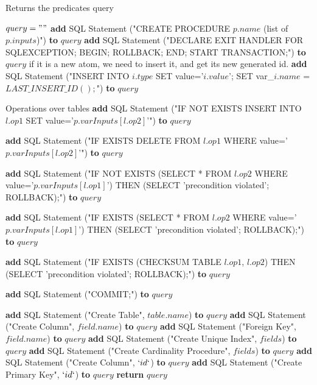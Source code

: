 \documentclass[oneside]{book}
\begin{document}
\begin{algorithm}
\caption{Returns the predicates query}
\label{array-sum2}
\begin{algorithmic}[2]
	\State $query = ""$
	\State \textbf{add} SQL Statement ("CREATE PROCEDURE $p.name$ (list of $p.inputs$)") \textbf{to} $query$
	\State \textbf{add} SQL Statement ("DECLARE EXIT HANDLER FOR SQLEXCEPTION; BEGIN; ROLLBACK; END; START TRANSACTION;") \textbf{to} $query$
		 \Comment if it is a new atom, we need to insert it, and get its new generated id.
			 \State \textbf{add} SQL Statement ("INSERT INTO $i.type$ SET value='$i.value$'; SET var\_$i.name$ = $LAST\_INSERT\_ID();$") \textbf{to} $query$
			\EndIf
		\EndFor
		
		\Comment Operations over tables
			 \State \textbf{add} SQL Statement ("IF NOT EXISTS INSERT INTO $l.op1$ SET value='$p.varInputs[l.op2]$'") \textbf{to} $query$
			
			 \State \textbf{add} SQL Statement ("IF EXISTS DELETE FROM $l.op1$ WHERE value='$p.varInputs[l.op2]$'") \textbf{to} $query$
			
			 \State \textbf{add} SQL Statement ("IF NOT EXISTS (SELECT * FROM $l.op2$ WHERE value='$p.varInputs[l.op1]$') THEN (SELECT 'precondition violated'; ROLLBACK);") \textbf{to} $query$
			
			 \State \textbf{add} SQL Statement ("IF EXISTS (SELECT * FROM $l.op2$ WHERE value='$p.varInputs[l.op1]$') THEN (SELECT 'precondition violated'; ROLLBACK);") \textbf{to} $query$
			
			 \State \textbf{add} SQL Statement ("IF EXISTS (CHECKSUM TABLE $l.op1$, $l.op2$) THEN (SELECT 'precondition violated'; ROLLBACK);") \textbf{to} $query$
			
			\EndIf
		\EndFor

	\State \textbf{add} SQL Statement ("COMMIT;") \textbf{to} $query$
	
		\State \textbf{add} SQL Statement ("Create Table", $table.name$) \textbf{to} $query$
			\State \textbf{add} SQL Statement ("Create Column", $field.name$) \textbf{to} $query$
			\State \textbf{add} SQL Statement ("Foreign Key", $field.name$) \textbf{to} $query$
			 \State \textbf{add} SQL Statement ("Create Unique Index", $fields$) \textbf{to} $query$
			\EndIf
			 \State \textbf{add} SQL Statement ("Create Cardinality Procedure", $fields$) \textbf{to} $query$
			\EndIf
		\EndFor
		\State \textbf{add} SQL Statement ("Create Column", $`id`$) \textbf{to} $query$
		\State \textbf{add} SQL Statement ("Create Primary Key", $`id`$) \textbf{to} $query$
	\EndFor
			\State \textbf{return} $query$
\EndFunction
\end{algorithmic}
\end{algorithm}
\end{document}
